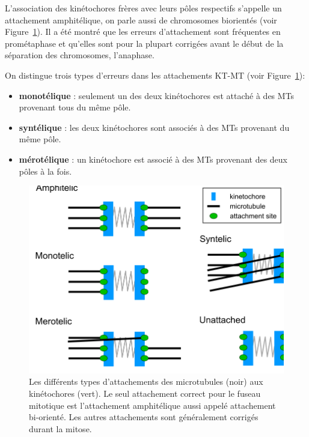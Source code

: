 \documentclass[12pt,a4paper,twoside,openright]{book}
\begin{document}
L'association des kinétochores frères avec leurs pôles respectifs
s'appelle un attachement amphitélique, on parle aussi de chromosomes
biorientés (voir Figure~\ref{fig:attachements}). Il a été montré que les
erreurs d'attachement sont fréquentes en prométaphase et qu'elles sont
pour la plupart corrigées avant le début de la séparation des
chromosomes, l'anaphase.

On distingue trois types d'erreurs dans les attachements KT-MT (voir
Figure~\ref{fig:attachements}):

\begin{itemize}
\item
  \textbf{monotélique} : seulement un des deux kinétochores est attaché
  à des MTs provenant tous du même pôle.
\item
  \textbf{syntélique} : les deux kinétochores sont associés à des MTs
  provenant du même pôle.
\item
  \textbf{mérotélique} : un kinétochore est associé à des MTs provenant
  des deux pôles à la fois.
\end{itemize}

\begin{figure}[htbp]
\centering
\includegraphics{figures/intro/attachments.png}
\caption[Les différents types d'attachements des microtubules aux kinétochores]{\label{fig:attachements}Les
différents types d'attachements des microtubules (noir) aux kinétochores
(vert). Le seul attachement correct pour le fuseau mitotique est
l'attachement amphitélique aussi appelé attachement bi-orienté. Les
autres attachements sont généralement corrigés durant la mitose.}
\end{figure}
\end{document}
